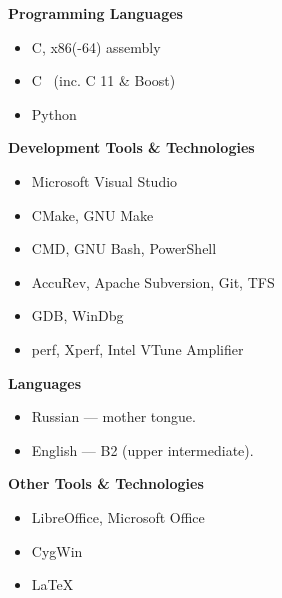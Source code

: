 \documentclass[11pt]{article}
\newcommand\CXX{%
  C\nolinebreak[4]\hspace{-.05em}\raisebox{.4ex}{\relsize{-3}{\textbf{++}}}%
}
\newcommand\CvBigSkipLength{1em}
\newcommand\CvSkip[1]{\vspace{#1}}
\newcommand\CvBigSkip{\CvSkip{\CvBigSkipLength}}
\newcommand\CvSectionHeader[1]{\CvBigSkip\textbf{#1}\CvBigSkip}
\begin{document}
\begin{minipage}[t]{.49\linewidth}
\CvSectionHeader{Programming Languages}

\begin{itemize}
\item C, x86(-64) assembly
\item \CXX\ (inc. {\CXX}11 \& Boost)
\item Python
\end{itemize}

\CvSectionHeader{Development Tools \& Technologies}

\begin{itemize}
\item Microsoft Visual Studio
\item CMake, GNU Make
\item CMD, GNU Bash, PowerShell
\item AccuRev, Apache Subversion, Git, TFS
\item GDB, WinDbg
\item perf, Xperf, Intel VTune Amplifier
\end{itemize}
\hfill
\end{minipage}
\begin{minipage}[t]{.49\linewidth}
\CvSectionHeader{Languages}

\begin{itemize}
\item Russian --- mother tongue.
\item English --- B2 (upper intermediate).
\end{itemize}

\CvSectionHeader{Other Tools \& Technologies}

\begin{itemize}
\item LibreOffice, Microsoft Office
\item CygWin
\item \LaTeX
\end{itemize}
\end{minipage}
\end{document}
